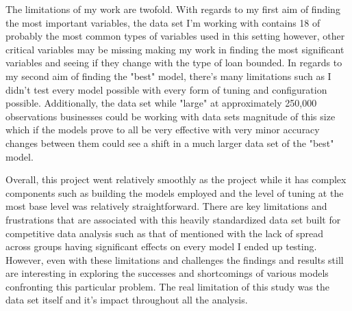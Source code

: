 \documentclass[12pt]{article}
\begin{document}
The limitations of my work are twofold. With regards to my first aim of finding the most important variables, the data set I'm working with contains 18 of probably the most common types of variables used in this setting however, other critical variables may be missing making my work in finding the most significant variables and seeing if they change with the type of loan bounded. In regards to my second aim of finding the "best" model, there's many limitations such as I didn't test every model possible with every form of tuning and configuration possible. Additionally, the data set while "large" at approximately 250,000 observations businesses could be working with data sets magnitude of this size which if the models prove to all be very effective with very minor accuracy changes between them could see a shift in a much larger data set of the "best" model.  

Overall, this project went relatively smoothly as the project while it has complex components such as building the models employed and the level of tuning at the most base level was relatively straightforward. There are key limitations and frustrations that are associated with this heavily standardized data set built for competitive data analysis such as that of mentioned with the lack of spread across groups having significant effects on every model I ended up testing. However, even with these limitations and challenges the findings and results still are interesting in exploring the successes and shortcomings of various models confronting this particular problem. The real limitation of this study was the data set itself and it's impact throughout all the analysis.



\end{document}
